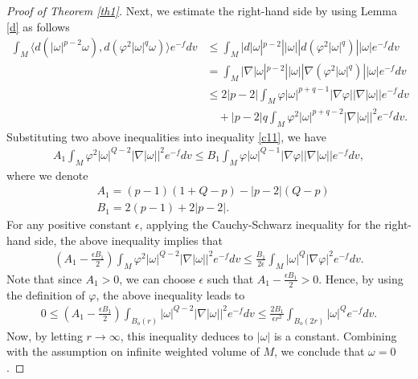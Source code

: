 \documentclass[leqno,12pt]{article} %
\theoremstyle{plain} %
\theoremstyle{definition} %
\numberwithin{equation}{section}
\begin{document}
\begin{proof}[Proof of Theorem \ref{th1}]
Next, we estimate the right-hand side by using Lemma \ref{d} as follows
\begin{align} \label{d1} \nonumber
	\int_M \langle d(|\omega|^{p-2}\omega),d(\varphi^2 |\omega|^q\omega) \rangle e^{-f}dv\nonumber
&\le \int_M |d|\omega|^{p-2}||\omega||d(\varphi^2 |\omega|^q)||\omega| e^{-f}dv\\\nonumber
	&= \int_M |\nabla|\omega|^{p-2}||\omega||\nabla(\varphi^2 |\omega|^q)||\omega| e^{-f}dv\\ 
	&\le 2|p-2| \int_M \varphi |\omega|^{p+q-1}|\nabla \varphi||\nabla|\omega||e^{-f}dv \nonumber\\ & \quad+ 
	|p-2|q \int_M  \varphi^2 |\omega|^{p+q-2}|\nabla|\omega||^2 e^{-f}dv.
\end{align}
	Substituting two above inequalities into inequality \eqref{c11}, we have
	\begin{align}\nonumber
		A_1 \int_M \varphi^2 |\omega|^{Q-2}|\nabla|\omega||^2 e^{-f}dv \le B_1 \int_M \varphi |\omega|^{Q-1} |\nabla \varphi||\nabla|\omega||e^{-f}dv,
	\end{align}
	where we denote
	\begin{align*}
		&A_1=(p-1)(1+Q-p)-|p-2|(Q-p)\\
		&B_1=2(p-1)+2|p-2|.
	\end{align*}
	For any positive constant $\epsilon$, applying the Cauchy-Schwarz inequality for the right-hand side, the above inequality implies that
	\begin{align}\nonumber
		\left(A_1-\frac{\epsilon B_1}{2}\right) \int_M \varphi^2 |\omega|^{Q-2}|\nabla|\omega||^2 e^{-f}dv \le \frac{B_1}{2\epsilon} \int_M |\omega|^{Q} |\nabla \varphi|^2e^{-f}dv.
	\end{align}
	Note that since $A_1>0$, we can choose $\epsilon$ such that $A_1-\frac{\epsilon B_1}{2}>0$. Hence, by using the definition of $\varphi$, the above inequality leads to
		\begin{align}
	0\le	\left(A_1-\frac{\epsilon B_1}{2}\right) \int_{B_o(r)}  |\omega|^{Q-2}|\nabla|\omega||^2 e^{-f}dv \le \frac{2B_1}{\epsilon r^2} \int_{B_o(2r)} |\omega|^{Q} e^{-f}dv.
	\end{align}
	Now, by letting $r \to \infty$, this inequality deduces to $|\omega|$ is a constant. Combining with the assumption on infinite weighted volume of $M$, we conclude that $\omega =0$.
	

\end{proof}
\end{document}
